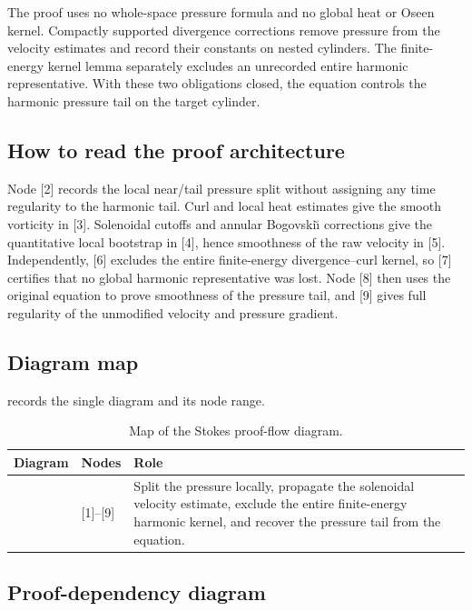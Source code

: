 \documentclass[11pt,reqno]{amsart}
\theoremstyle{plain}
\theoremstyle{definition}
\theoremstyle{remark}
\numberwithin{equation}{section}
\begin{document}
The proof uses no whole-space pressure formula and no global heat or Oseen
kernel.  Compactly supported divergence corrections remove pressure from the
velocity estimates and record their constants on nested cylinders.  The
finite-energy kernel lemma separately excludes an unrecorded entire harmonic
representative.  With these two obligations closed, the equation controls the
harmonic pressure tail on the target cylinder.

\subsection{How to read the proof architecture}

Node [2] records the local near/tail pressure split without assigning any time
regularity to the harmonic tail.  Curl and local heat estimates give the
smooth vorticity in [3].  Solenoidal cutoffs and annular Bogovski\u\i{}
corrections give the quantitative local bootstrap in [4], hence smoothness of
the raw velocity in [5].  Independently, [6] excludes the entire finite-energy
divergence--curl kernel, so [7] certifies that no global harmonic representative
was lost.  Node [8] then uses the original equation to prove smoothness of the
pressure tail, and [9] gives full regularity of the unmodified velocity and
pressure gradient.

\subsection{Diagram map}

 records the single diagram and its node range.

\begin{table}[H]
\caption{Map of the Stokes proof-flow diagram.}
\label{tab:stokes-diagram-map}
\centering
\small
\begin{tabularx}{\textwidth}{@{}L{0.18\textwidth}L{0.20\textwidth}Y@{}}
\toprule
Diagram & Nodes & Role \\
\midrule
{} & [1]--[9] & Split the pressure locally, propagate
the solenoidal velocity estimate, exclude the entire finite-energy harmonic
kernel, and recover the pressure tail from the equation. \\
\bottomrule
\end{tabularx}
\end{table}

\subsection{Proof-dependency diagram}
\end{document}
